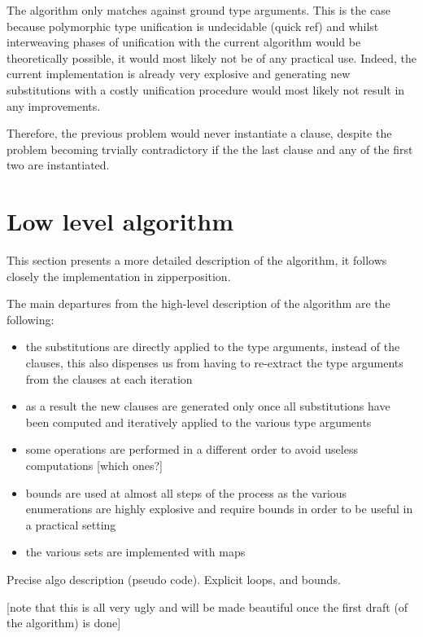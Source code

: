 \documentclass{article}
\begin{document}
The algorithm only matches against ground type arguments. This is the case because polymorphic type unification is undecidable (quick ref) and whilst interweaving phases of unification with the current algorithm would be theoretically possible, it would most likely not be of any practical use. Indeed, the current implementation is already very explosive and generating new substitutions with a costly unification procedure would most likely not result in any improvements.


Therefore, the previous problem would never instantiate a clause, despite the problem becoming trvially contradictory if the the last clause and any of the first two are instantiated.

\section{Low level algorithm}

This section presents a more detailed description of the algorithm, it follows closely the implementation in zipperposition.

The main departures from the high-level description of the algorithm are the following:
\begin{itemize}
   \item the substitutions are directly applied to the type arguments, instead of the clauses, this also dispenses us from having to re-extract the type arguments from the clauses at each iteration
   \item as a result the new clauses are generated only once all substitutions have been computed and iteratively applied to the various type arguments
   \item some operations are performed in a different order to avoid useless computations [which ones?]
   \item bounds are used at almost all steps of the process as the various enumerations are highly explosive and require bounds in order to be useful in a practical setting
   \item the various sets are implemented with maps
\end{itemize}

Precise algo description (pseudo code). Explicit loops, and bounds.

[note that this is all very ugly and will be made beautiful once the first draft (of the algorithm) is done]
\end{document}
